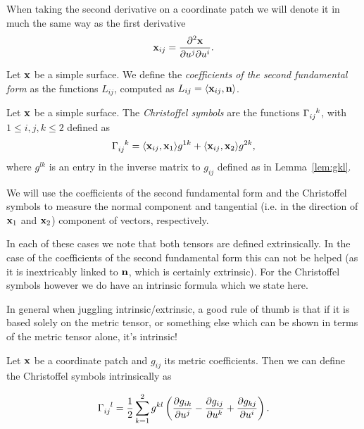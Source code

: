   \begin{unno_rem}
    When taking the second derivative on a coordinate patch we will denote it in much the same way as the first derivative
    \[
      \mathbf{x}_{ij} = \frac{\partial^2\mathbf{x}}{\partial u^j \partial u^i}.
    \]
  \end{unno_rem}

  \begin{defn}
    Let $\mathbf{x}$ be a simple surface. We define the \emph{coefficients of the second fundamental form} as the functions $L_{ij}$, computed as $L_{ij} = \langle\mathbf{x}_{ij}, \mathbf{n}\rangle$. 
  \end{defn}

  \begin{defn}
    Let $\mathbf{x}$ be a simple surface. The \emph{Christoffel symbols} are the functions $\Cfl$, with $1 \le i, j, k \le 2$ defined as
    \[
      \Cfl = \la\bx_{ij}, \bx_{1}\ra g^{1k} + \la\bx_{ij}, \bx_{2}\ra g^{2k},
    \]
    where $g^{lk}$ is an entry in the inverse matrix to $g_{ij}$ defined as in Lemma~\ref{lem:gkl}. 
  \end{defn}
  
  We will use the coefficients of the second fundamental form and the Christoffel symbols to measure the normal component and tangential (i.e. in the direction of $\mathbf{x}_1$ and $\mathbf{x}_2$) component of vectors, respectively.
  
  In each of these cases we note that both tensors are defined extrinsically. In the case of the coefficients of the second fundamental form this can not be helped (as it is inextricably linked to $\mathbf{n}$, which is certainly extrinsic). For the Christoffel symbols however we do have an intrinsic formula which we state here.

  \begin{unno_rem}
    In general when juggling intrinsic/extrinsic, a good rule of thumb is that if it is based solely on the metric tensor, or something else which can be shown in terms of the metric tensor alone, it's intrinsic!
  \end{unno_rem}

  \begin{prop}
    Let $\mathbf{x}$ be a coordinate patch and $g_{ij}$ its metric coefficients. Then we can define the Christoffel symbols intrinsically as
    
    \begin{equation}
      \label{eq:intrinsic_cfl}
      \cfl{i}{j}{l} = \frac{1}{2} \sum_{k = 1}^2 g^{kl} \left(\frac{\del g_{ik}}{\del u^j} - \frac{\del g_{ij}}{\del u^k} + 
    \frac{\del g_{kj}}{\del u^i}\right).
    \end{equation}
  \end{prop}

